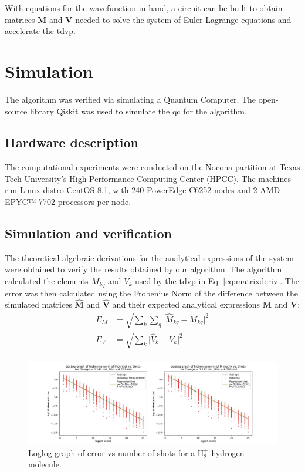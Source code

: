 \documentclass{aux/ttuthes2007}
\begin{document}
With equations for the wavefunction in hand, a circuit can be built to obtain matrices $\bm M$ and $\bm V$ needed to solve the system of Euler-Lagrange equations and accelerate the \gls{tdvp}.

\section{\textbf{Simulation}}

The algorithm was verified via simulating a Quantum Computer. The open-source library Qiskit was used to simulate the \gls{qc} for the algorithm.

\subsection{\textbf{Hardware description}}
The computational experiments were conducted on the Nocona partition at Texas Tech University's High-Performance Computing Center (HPCC). The machines run Linux distro CentOS 8.1, with 240 PowerEdge C6252 nodes and 2 AMD EPYC™ 7702 processors per node.
%

\subsection{\textbf{Simulation and verification}}

The theoretical algebraic derivations for the analytical expressions of the system were obtained to verify the results obtained by our algorithm.
The algorithm calculated the elements $M_{kq}$ and $V_k$ used by the \gls{tdvp} in Eq. \ref{eq:matrixderiv}. The error was then calculated using the Frobenius Norm of the difference between the simulated matrices $\hat {\bm M}$ and $\hat {\bm V}$ and their expected analytical expressions $\bm {\bar M}$ and $\bm {\bar V}$:
%
\begin{equation*}
	\begin{split}
		E_M &= \sqrt{\sum_k \sum_q \lvert {\hat M_{kq} - \bar M_{kq}} \rvert ^ 2 }\\
		E_V &= \sqrt{\sum_k \lvert {\hat V_{k} - \bar V_{k}} \rvert ^ 2 }\\
	\end{split}
\end{equation*}
%
\begin{figure}[h!]
	\includegraphics[width=\linewidth]{img/1e.jpg}
	\caption{Loglog graph of error vs number of shots for a $\text{H}_2^+$ hydrogen molecule.}
  \label{fig:1derrorgraph}
\end{figure}
\end{document}

